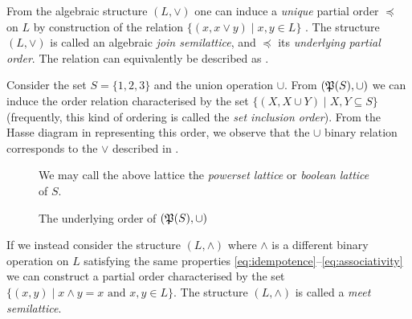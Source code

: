 From the algebraic structure $(L, \vee)$ one can induce a \textit{unique} partial order $\preceq$ on $L$ by construction of the relation $\{( x, x \vee y) \mid x,y \in L \}$
\cite[pp. 173]{bergman2015invitation}. The structure $(L, \vee)$ is called an algebraic \textit{join semilattice}, and $\preceq$ its \textit{underlying partial order}. The relation can equivalently be
described as  \cite[pp.173]{bergman2015invitation}.
%
\begin{example}
  \label{example:power-set-lattice} Consider the set $S = \{1,2,3\}$ and the union operation $\cup$. From $(\mathfrak{P}({S}), \cup)$ we can induce the order relation characterised by the set
  $\{(X, X \cup Y) \mid X,Y \subseteq S \}$ (frequently, this kind of ordering is called the \textit{set inclusion order}). From the Hasse diagram in  representing this
  order, we observe that the $\cup$ binary relation corresponds to the $\vee$ described in .
  \begin{figure}[H]
    \centering
    \caption{The underlying order of $(\mathfrak{P}({S}), \cup)$}
    \label{figure:set-inclusion-order}

    We may call the above lattice the \textit{powerset lattice} or \textit{boolean lattice} of $S$.
  \end{figure}
\end{example}

If we instead consider the structure $(L, \wedge)$ where $\wedge$ is a different binary operation on $L$ satisfying the same properties \cref{eq:idempotence}--\cref{eq:associativity} we can construct a
partial order characterised by the set $\{(x,y) \mid x \wedge y = x \text{ and }x,y \in L\}$. The structure $(L, \wedge)$ is called a \textit{meet semilattice}.

